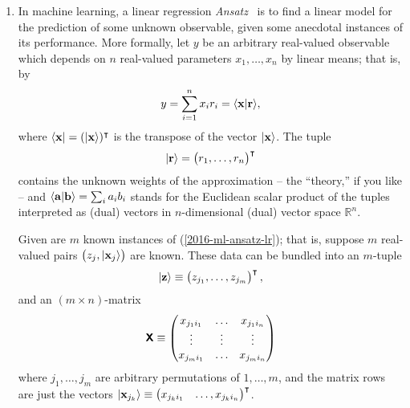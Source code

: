 {\begin{enumerate}
\item
In machine learning, a linear regression {\it Ansatz}~\cite{Goodfellow-et-al-2016-Book} is to find a linear model for the prediction of some unknown
observable, given some anecdotal instances of its performance.
More formally, let
$y$ be an arbitrary real-valued observable which depends
on $n$ real-valued parameters $x_1, \ldots , x_n$  by linear means; that is, by
\begin{equation}
y = \sum_{i=1}^n x_i r_i = \langle  {\bf x}\vert {\bf r} \rangle,
\label{2016-ml-ansatz-lr}
\end{equation}
where $\langle {\bf x} \vert = (\vert {\bf x} \rangle )^\intercal $ is the transpose
of the vector $\vert {\bf x} \rangle$.
The tuple
\begin{equation}
\vert {\bf r} \rangle = \begin{pmatrix} r_1, \ldots , r_n \end{pmatrix}^\intercal
\label{2016-ml-ansatz-vectorweights}
\end{equation}
contains the unknown weights of the approximation --
the ``theory,'' if you like --
and $\langle  {\bf a}\vert {\bf b} \rangle = \sum_i a_ib_i$ stands for the Euclidean scalar product of the tuples interpreted
as (dual) vectors in $n$-dimensional (dual) vector space $\mathbb{R}^n$.

Given are $m$ known instances of (\ref{2016-ml-ansatz-lr}); that is, suppose $m$ real-valued pairs
$\begin{pmatrix}z_j, \vert {\bf x}_j \rangle \end{pmatrix}$ are known.
These data can be bundled into an $m$-tuple
\begin{equation}
\vert {\bf z} \rangle \equiv \begin{pmatrix} z_{j_1}, \ldots , z_{j_m} \end{pmatrix}^\intercal ,
\end{equation}
and an $(m \times n)$-matrix
\begin{equation}
\textsf{\textbf{X}} \equiv
\begin{pmatrix}
x_{{j_1}{i_1}} & \ldots & x_{{j_1}{i_n}}\\
\vdots & \vdots & \vdots \\
x_{{j_m}{i_1}} & \ldots & x_{{j_m}{i_n}}
\end{pmatrix}
\end{equation}
where $j_1,\ldots , j_m$ are arbitrary permutations of $1,\ldots ,m$,
and the matrix rows are just the vectors
$\vert {\bf x}_{j_k} \rangle \equiv \begin{pmatrix} x_{{j_k}{i_1}} & \ldots , x_{{j_k}{i_n}} \end{pmatrix}^\intercal $.


\end{enumerate}}
